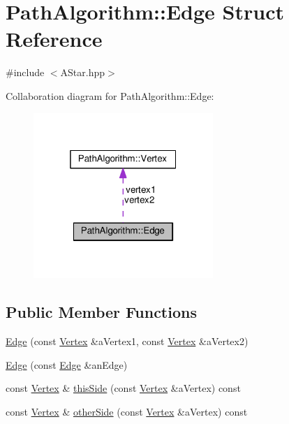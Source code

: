 \hypertarget{struct_path_algorithm_1_1_edge}{}\section{Path\+Algorithm\+:\+:Edge Struct Reference}
\label{struct_path_algorithm_1_1_edge}


{\ttfamily \#include $<$A\+Star.\+hpp$>$}



Collaboration diagram for Path\+Algorithm\+:\+:Edge\+:\nopagebreak
\begin{figure}[H]
\begin{center}
\leavevmode
\includegraphics[width=193pt]{struct_path_algorithm_1_1_edge__coll__graph}
\end{center}
\end{figure}
\subsection*{Public Member Functions}
\begin{DoxyCompactItemize}
\item 
\hyperlink{struct_path_algorithm_1_1_edge_a4378105bc5d8b8b2fd147cb8b5a62662}{Edge} (const \hyperlink{struct_path_algorithm_1_1_vertex}{Vertex} \&a\+Vertex1, const \hyperlink{struct_path_algorithm_1_1_vertex}{Vertex} \&a\+Vertex2)
\item 
\hyperlink{struct_path_algorithm_1_1_edge_a2a1cfa63c51fac6e9c7385ab6b0b0b0c}{Edge} (const \hyperlink{struct_path_algorithm_1_1_edge}{Edge} \&an\+Edge)
\item 
const \hyperlink{struct_path_algorithm_1_1_vertex}{Vertex} \& \hyperlink{struct_path_algorithm_1_1_edge_a0a987c8705e5e41f890fb4f222243af8}{this\+Side} (const \hyperlink{struct_path_algorithm_1_1_vertex}{Vertex} \&a\+Vertex) const 
\item 
const \hyperlink{struct_path_algorithm_1_1_vertex}{Vertex} \& \hyperlink{struct_path_algorithm_1_1_edge_a204de7bc294af2cd5df73c29b2587345}{other\+Side} (const \hyperlink{struct_path_algorithm_1_1_vertex}{Vertex} \&a\+Vertex) const 
\end{DoxyCompactItemize}
